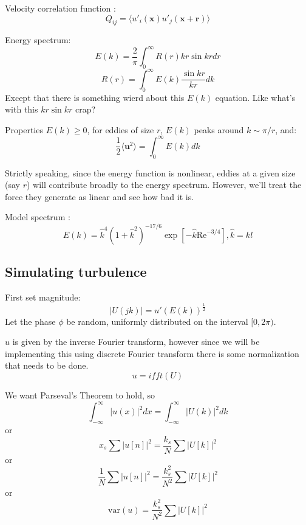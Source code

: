 \documentclass{jfm}
\begin{document}
Velocity correlation function \cite{Davidson:2004}:
\begin{equation}
Q_{ij} = \langle u'_i(\mathbf{x}) u'_j(\mathbf{x}+\mathbf{r}) \rangle
\end{equation}

Energy spectrum:
\begin{equation}
E(k) = \frac{2}{\pi} \int_0^\infty R(r) k r \sin{kr} dr
\end{equation}
\begin{equation}
R(r) = \int_0^\infty E(k) \frac{\sin{kr}}{kr} dk
\end{equation}
Except that there is something wierd about this $E(k)$ equation. Like what's with this $kr\sin{kr}$ crap? 

Properties $E(k)\geq 0$, for eddies of size $r$, $E(k)$ peaks around $k \sim \pi/r$, and:
\begin{equation}
\frac{1}{2}\langle \mathbf{u}^2 \rangle = \int_0^\infty E(k) dk
\end{equation}

Strictly speaking, since the energy function is nonlinear, eddies at a given size (say $r$) will contribute broadly to the energy spectrum.  However, we'll treat the force they generate as linear and see how bad it is. 

Model spectrum \cite{Davidson:2004}:
\begin{equation}
E(k) = \hat{k}^4 (1+\hat{k}^2)^{-17/6} \exp{[-\hat{k} \mbox{Re}^{-3/4}]}, \hat{k} = kl
\end{equation}

\subsection{Simulating turbulence}

First set magnitude:
\begin{equation}
|U(jk)| = u' \left( E(k) \right)^{\frac{1}{2}}
\end{equation}
Let the phase $\phi$ be random, uniformly distributed on the interval $[0,2\pi)$.

$u$ is given by the inverse Fourier transform, however since we will be implementing this using discrete Fourier transform there is some normalization that needs to be done. 
\begin{equation}
u = ifft(U)
\end{equation}

We want Parseval's Theorem to hold, so 
\begin{equation}
\int_{-\infty}^\infty |u(x)|^2 dx 
=
\int_{-\infty}^\infty |U(k)|^2 dk
\end{equation}
or
\begin{equation}
x_s \sum |u[n]|^2 
=
\frac{k_s}{N} \sum |U[k]|^2
\end{equation}
or
\begin{equation}
\frac{1}{N} \sum |u[n]|^2 
=
\frac{k_s^2}{N^2} \sum |U[k]|^2
\end{equation}
or
\begin{equation}
\mbox{var}(u) 
=
\frac{k_s^2}{N^2} \sum |U[k]|^2
\end{equation}
\end{document}
